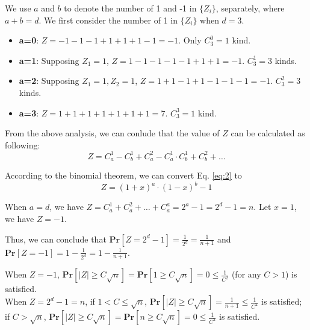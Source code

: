 \begin{problem}[15 points]
\begin{enumerate}[(a)]
\Answer
We use $a$ and $b$ to denote the number of 1 and -1 in $\{Z_i\}$, separately, where $ a+b = d$.
We first consider the number of 1 in $\{Z_i\}$ when $d=3$.
\begin{itemize}
    \item \textbf{a=0}: $Z= -1-1-1+1+1+1-1 = -1$. Only $C_3^0=1$ kind.
    \item \textbf{a=1}: Supposing $Z_1=1$, $Z= 1-1-1-1-1+1+1 =-1$. $C_3^1=3$ kinds.
    \item \textbf{a=2}: Supposing $Z_1=1, Z_2=1$, $Z= 1+1-1+1-1-1-1 =-1$. $C_3^2=3$ kinds.
    \item \textbf{a=3}: $Z= 1+1+1+1+1+1+1 =7$. $C_3^3=1$ kind.
\end{itemize} 

From the above analysis, we can conlude that the value of $Z$ can be calculated as following:
\begin{equation} \label{eq:2}
    Z = C_a^1 - C_b^1 + C_a^2 - C_a^1 \cdot C_b^1 + C_b^2 + \dots
\end{equation}

According to the binomial theorem, we can convert Eq. \eqref{eq:2} to 
\begin{equation}
    Z= (1+x)^a \cdot (1-x)^b-1
\end{equation}

When $a=d$, we have $Z= C_a^1+C_a^2+\dots+C_a^a=2^a-1 = 2^d-1=n$. Let $x=1$, we have $Z=-1$.

Thus, we can conclude that $\mathbf{Pr}[Z = 2^d - 1] = \frac{1}{2^d} = \frac{1}{n+1}$ and $\mathbf{Pr}[Z = -1] = 1 - \frac{1}{2^d} = 1 - \frac{1}{n+1}$.

When $Z = -1$, $\mathbf{Pr}[|Z| \ge C\sqrt{n}] = \mathbf{Pr}[1 \ge C\sqrt{n}] = 0 \le \frac{1}{C^2}$ (for any $C > 1$) is satisfied. \\
When $Z = 2^d - 1 = n$, if $1 < C \le \sqrt{n}$, $\mathbf{Pr}[|Z| \ge C\sqrt{n}] = \frac{1}{n+1} \le \frac{1}{C^2}$ is satisfied; if $C > \sqrt{n}$, $\mathbf{Pr}[|Z| \ge C\sqrt{n}] = \mathbf{Pr}[n \ge C\sqrt{n}] = 0 \le \frac{1}{C^2}$ is satisfied. 

\end{enumerate}
\end{problem}

